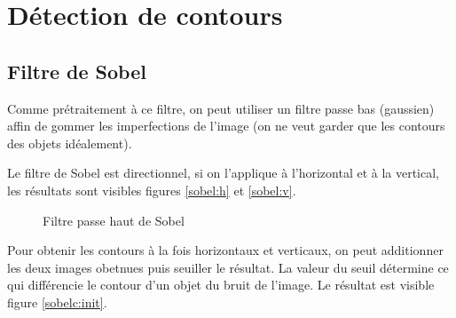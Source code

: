 \documentclass{article}
\begin{document}
\section{Détection de contours}
\subsection{Filtre de Sobel}
Comme prétraitement à ce filtre, on peut utiliser un filtre passe bas (gaussien) affin de gommer les imperfections de
l'image
(on ne veut garder que les contours des objets idéalement).

Le filtre de Sobel est directionnel, si on l'applique à l'horizontal et à la vertical, les résultats sont visibles
figures \ref{sobel:h} et \ref{sobel:v}.

\begin{figure}[!ht]%
  \centering
  \hspace{0.030\textwidth}
  \caption{Filtre passe haut de Sobel}
  \label{rehauss:init}
\end{figure}

Pour obtenir les contours à la fois horizontaux et verticaux, on peut additionner les deux images obetnues puis
seuiller le résultat. La valeur du seuil détermine ce qui différencie le contour d'un objet du bruit de l'image.
Le résultat est visible figure \ref{sobelc:init}.
\end{document}
